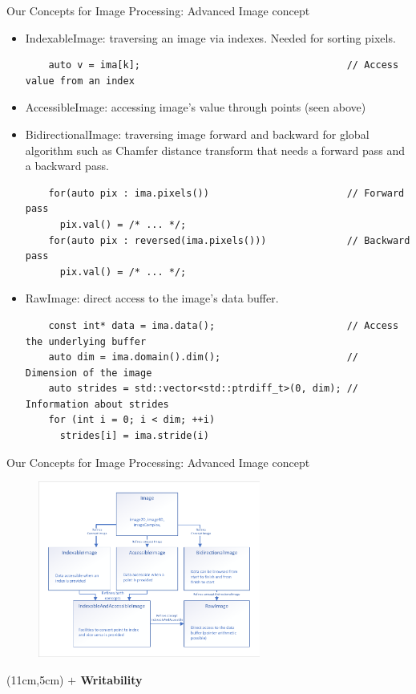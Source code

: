 \documentclass[12pt,aspectratio=169]{beamer}
\begin{document}
\begin{frame}[fragile]{Our Concepts for Image Processing: Advanced Image concept}
  \begin{itemize}
    \item IndexableImage: traversing an image via indexes. Needed for sorting pixels.
          \begin{verbatim}
    auto v = ima[k];                                    // Access value from an index
    \end{verbatim}
    \item AccessibleImage: accessing image's value through points (seen above)
    \item BidirectionalImage: traversing image forward and backward for global algorithm such as Chamfer distance
          transform that needs a forward pass and a backward pass.
          \begin{verbatim}
    for(auto pix : ima.pixels())                        // Forward pass
      pix.val() = /* ... */;
    for(auto pix : reversed(ima.pixels()))              // Backward pass
      pix.val() = /* ... */;
    \end{verbatim}
    \item RawImage: direct access to the image's data buffer.
          \begin{verbatim}
    const int* data = ima.data();                       // Access the underlying buffer
    auto dim = ima.domain().dim();                      // Dimension of the image
    auto strides = std::vector<std::ptrdiff_t>(0, dim); // Information about strides
    for (int i = 0; i < dim; ++i)
      strides[i] = ima.stride(i)
      \end{verbatim}
  \end{itemize}
\end{frame}

\begin{frame}[fragile]{Our Concepts for Image Processing: Advanced Image concept}
  \begin{figure}
    \flushleft
    \includegraphics[width=0.65\textwidth]{../figures/concepts/images_all_rework}
  \end{figure}
  \begin{textblock*}{4cm}(11cm,5cm)
    \Large\textbf{\(+\) Writability}
  \end{textblock*}
\end{frame}
\end{document}
